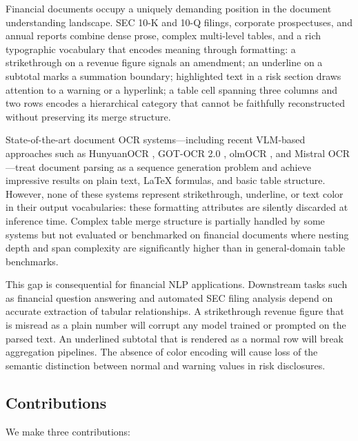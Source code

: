 \documentclass[10pt,twocolumn]{article}
\begin{document}
Financial documents occupy a uniquely demanding position in the document
understanding landscape. SEC 10-K and 10-Q filings, corporate prospectuses, and
annual reports combine dense prose, complex multi-level tables, and a rich
typographic vocabulary that encodes meaning through formatting: a strikethrough
on a revenue figure signals an amendment; an underline on a subtotal marks a
summation boundary; highlighted text in a risk section draws attention to a warning
or a hyperlink; a table cell spanning three columns and two rows encodes a
hierarchical category that cannot be faithfully reconstructed without preserving
its merge structure.

State-of-the-art document OCR systems---including recent VLM-based approaches
such as HunyuanOCR \cite{hunyuanocr2025}, GOT-OCR 2.0 \cite{wei2024gotocr2},
olmOCR \cite{poznanski2025olmocr}, and Mistral OCR \cite{mistral2025ocr}---treat
document parsing as a sequence generation problem and achieve impressive results
on plain text, LaTeX formulas, and basic table structure. However, none of these
systems represent strikethrough, underline, or text color in their output
vocabularies: these formatting attributes are silently discarded at inference
time. Complex table merge structure is partially handled by some systems but not
evaluated or benchmarked on financial documents where nesting depth and span
complexity are significantly higher than in general-domain table benchmarks.

This gap is consequential for financial NLP applications. Downstream tasks such
as financial question answering \cite{chen2021finqa,zhu2021tatqa} and automated
SEC filing analysis depend on accurate extraction of tabular relationships. A
strikethrough revenue figure that is misread as a plain number will corrupt any
model trained or prompted on the parsed text. An underlined subtotal that is
rendered as a normal row will break aggregation pipelines. The absence of color
encoding will cause loss of the semantic distinction between normal and warning
values in risk disclosures.

\subsection{Contributions}
\label{sec:intro:contributions}

We make three contributions:
\end{document}
